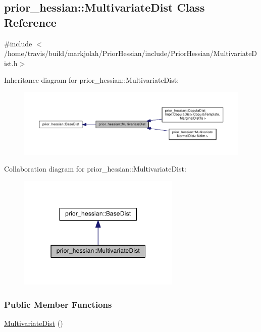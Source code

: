\hypertarget{classprior__hessian_1_1MultivariateDist}{}\subsection{prior\+\_\+hessian\+:\+:Multivariate\+Dist Class Reference}
\label{classprior__hessian_1_1MultivariateDist}


{\ttfamily \#include $<$/home/travis/build/markjolah/\+Prior\+Hessian/include/\+Prior\+Hessian/\+Multivariate\+Dist.\+h$>$}



Inheritance diagram for prior\+\_\+hessian\+:\+:Multivariate\+Dist\+:\nopagebreak
\begin{figure}[H]
\begin{center}
\leavevmode
\includegraphics[width=350pt]{classprior__hessian_1_1MultivariateDist__inherit__graph}
\end{center}
\end{figure}


Collaboration diagram for prior\+\_\+hessian\+:\+:Multivariate\+Dist\+:\nopagebreak
\begin{figure}[H]
\begin{center}
\leavevmode
\includegraphics[width=220pt]{classprior__hessian_1_1MultivariateDist__coll__graph}
\end{center}
\end{figure}
\subsubsection*{Public Member Functions}
\begin{DoxyCompactItemize}
\item 
\hyperlink{classprior__hessian_1_1MultivariateDist_a748d7905c857b3a4155bf4fc3bf00e11}{Multivariate\+Dist} ()
\end{DoxyCompactItemize}
